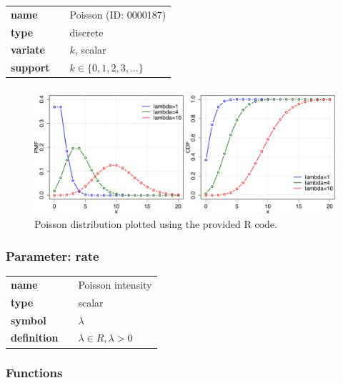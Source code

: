 \documentclass{article}
\begin{document}
  \bigskip 

\begin{tabular}{p{2cm}cl}
\textbf{name} & & Poisson (ID: 0000187)\\ 
 
\textbf{type} & & discrete \\ 

\textbf{variate} & & $k$, scalar \\ 

\textbf{support} & & $k \in \{0,1,2,3,\dots\}$
\end{tabular}

\begin{figure}[ht!]
\centering
  \includegraphics[width=140mm]{pics/Poisson.pdf}
 \caption{Poisson distribution plotted using the provided R code.}
 \label{fig:Poisson}
\end{figure}

\subsubsection*{Parameter: rate}

\noindent\begin{tabular}{p{2cm}cl}
\textbf{name} & & Poisson intensity \\
\textbf{type} & & scalar \\
\textbf{symbol} & & $\lambda$  \\
\textbf{definition} & & $\lambda \in R, \lambda > 0$
\end{tabular}
\subsubsection*{Functions}
\end{document}
